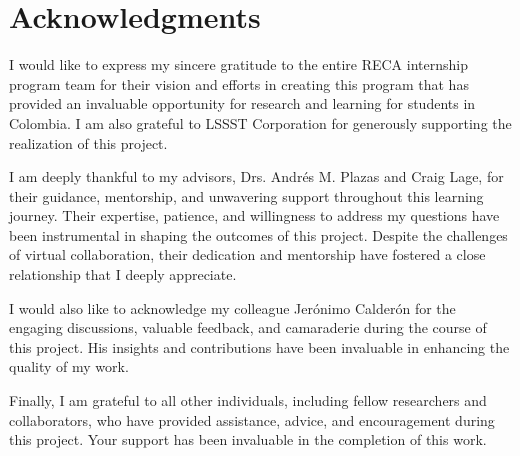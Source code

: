 \section{Acknowledgments} \label{sec:acknowledgments}


I would like to express my sincere gratitude to the entire RECA internship program team for their vision and efforts in creating this program that has provided an invaluable opportunity for research and learning for students in Colombia. I am also grateful to LSSST Corporation for generously supporting the realization of this project.

I am deeply thankful to my advisors, Drs. Andrés M. Plazas and Craig Lage, for their guidance, mentorship, and unwavering support throughout this learning journey. Their expertise, patience, and willingness to address my questions have been instrumental in shaping the outcomes of this project. Despite the challenges of virtual collaboration, their dedication and mentorship have fostered a close relationship that I deeply appreciate.

I would also like to acknowledge my colleague Jerónimo Calderón for the engaging discussions, valuable feedback, and camaraderie during the course of this project. His insights and contributions have been invaluable in enhancing the quality of my work.

Finally, I am grateful to all other individuals, including fellow researchers and collaborators, who have provided assistance, advice, and encouragement during this project. Your support has been invaluable in the completion of this work.